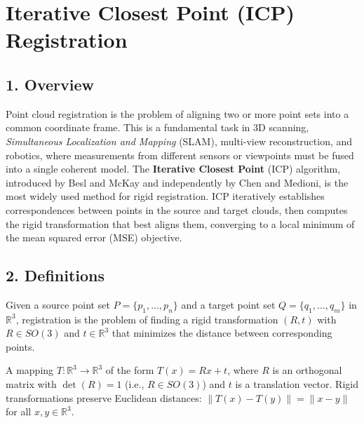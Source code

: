 \section{Iterative Closest Point (ICP) Registration}
\label{sec:icp_registration}

\subsection{1. Overview}

Point cloud registration is the problem of aligning two or more point sets into a common coordinate frame. This is a fundamental task in 3D scanning, \textit{Simultaneous Localization and Mapping} (SLAM), multi-view reconstruction, and robotics, where measurements from different sensors or viewpoints must be fused into a single coherent model\cite{besl1992}. The \textbf{Iterative Closest Point} (ICP) algorithm, introduced by Besl and McKay\cite{besl1992} and independently by Chen and Medioni\cite{chen1992}, is the most widely used method for rigid registration. ICP iteratively establishes correspondences between points in the source and target clouds, then computes the rigid transformation that best aligns them, converging to a local minimum of the mean squared error (MSE) objective.

\subsection{2. Definitions}

\begin{definition}\label{def:point_cloud_registration}
Given a source point set $P = \{p_1, \ldots, p_n\}$ and a target point set $Q = \{q_1, \ldots, q_m\}$ in $\mathbb{R}^3$, registration is the problem of finding a rigid transformation $(R, t)$ with $R \in SO(3)$ and $t \in \mathbb{R}^3$ that minimizes the distance between corresponding points.
\end{definition}

\begin{definition}\label{def:rigid_transformation}
A mapping $T: \mathbb{R}^3 \to \mathbb{R}^3$ of the form $T(x) = Rx + t$, where $R$ is an orthogonal matrix with $\det(R) = 1$ (i.e., $R \in SO(3)$) and $t$ is a translation vector. Rigid transformations preserve Euclidean distances: $\|T(x) - T(y)\| = \|x - y\|$ for all $x, y \in \mathbb{R}^3$.
\end{definition}

